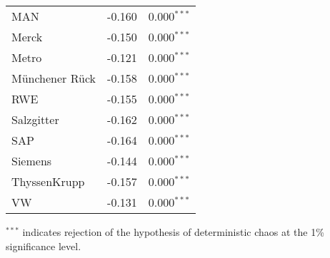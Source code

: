 \documentclass[12pt]{article}
\begin{document}
\begin{table} [H]
\begin{tabular*}{\textwidth}{@{\extracolsep{\fill}}lrl}
        MAN                       & -0.160 & 0.000$^{***}$\\ 
        Merck                     & -0.150 & 0.000$^{***}$\\ 
        Metro                      & -0.121 & 0.000$^{***}$ \\ 
        M\"unchener R\"uck        & -0.158 & 0.000$^{***}$\\ 
        RWE                       & -0.155 & 0.000$^{***}$\\ 
        Salzgitter                 & -0.162 & 0.000$^{***}$ \\ 
        SAP                       & -0.164 & 0.000$^{***}$\\ 
        Siemens                    & -0.144 & 0.000$^{***}$ \\ 
        ThyssenKrupp               & -0.157 & 0.000$^{***}$ \\ 
        VW                      & -0.131 &  0.000$^{***}$\\ 
        \hline      
    \end{tabular*}
    {$^{***}$ indicates rejection of the hypothesis of  deterministic chaos at the 1\% significance level.}
\end{table}
\end{document}

